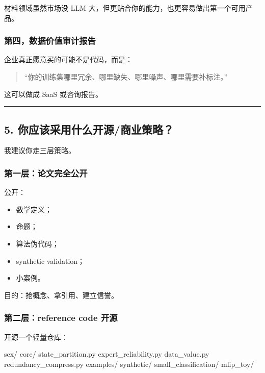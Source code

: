 \documentclass[
  12pt,
]{ctexart}
\newenvironment{Shaded}{}{}
\newcommand{\NormalTok}[1]{#1}
\providecommand{\tightlist}{%
  \setlength{\itemsep}{0pt}\setlength{\parskip}{0pt}}
\begin{document}
材料领域虽然市场没 LLM
大，但更贴合你的能力，也更容易做出第一个可用产品。

\subsubsection{第四，数据价值审计报告}\label{ux7b2cux56dbux6570ux636eux4ef7ux503cux5ba1ux8ba1ux62a5ux544a}

企业真正愿意买的可能不是代码，而是：

\begin{quote}
``你的训练集哪里冗余、哪里缺失、哪里噪声、哪里需要补标注。''
\end{quote}

这可以做成 SaaS 或咨询报告。

\begin{center}\rule{0.5\linewidth}{0.5pt}\end{center}

\subsection{5.
你应该采用什么开源/商业策略？}\label{ux4f60ux5e94ux8be5ux91c7ux7528ux4ec0ux4e48ux5f00ux6e90ux5546ux4e1aux7b56ux7565}

我建议你走三层策略。

\subsubsection{第一层：论文完全公开}\label{ux7b2cux4e00ux5c42ux8bbaux6587ux5b8cux5168ux516cux5f00}

公开：

\begin{itemize}
\tightlist
\item
  数学定义；
\item
  命题；
\item
  算法伪代码；
\item
  synthetic validation；
\item
  小案例。
\end{itemize}

目的：抢概念、拿引用、建立信誉。

\subsubsection{第二层：reference code
开源}\label{ux7b2cux4e8cux5c42reference-code-ux5f00ux6e90}

开源一个轻量仓库：

\begin{Shaded}
\begin{Highlighting}[]
\NormalTok{scx/}
\NormalTok{  core/}
\NormalTok{    state\_partition.py}
\NormalTok{    expert\_reliability.py}
\NormalTok{    data\_value.py}
\NormalTok{    redundancy\_compress.py}
\NormalTok{  examples/}
\NormalTok{    synthetic/}
\NormalTok{    small\_classification/}
\NormalTok{    mlip\_toy/}
\end{Highlighting}
\end{Shaded}
\end{document}
